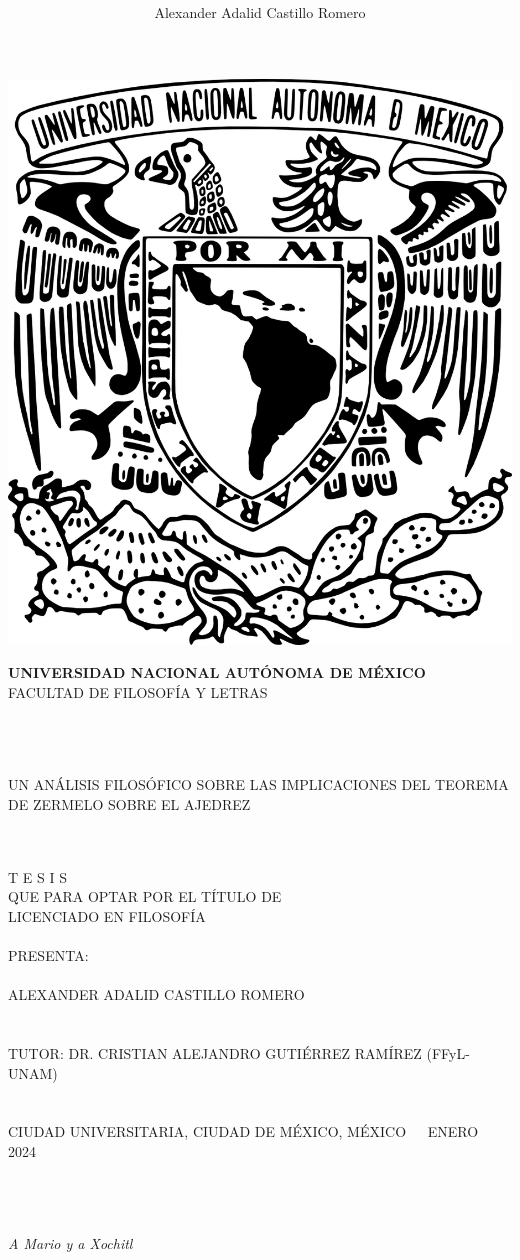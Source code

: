 \documentclass[twoside,openright,12pt,a4paper,spanish]{book}
\title{\textbf{}}
\author{Alexander Adalid Castillo Romero}
\begin{document}
\begin{titlepage}
\begin{center}

\includegraphics[width=3.15 cm,height=3.75 cm]{unam.png} 

\normalsize{\textbf{UNIVERSIDAD NACIONAL AUTÓNOMA DE MÉXICO}\\
FACULTAD DE FILOSOFÍA Y LETRAS \\ \ \\ \ \\ \ }


\Large{UN ANÁLISIS FILOSÓFICO SOBRE LAS IMPLICACIONES DEL TEOREMA DE ZERMELO SOBRE EL AJEDREZ\\ \ \\ \ }

\normalsize{T E S I S\\
QUE PARA OPTAR POR EL TÍTULO DE\\
LICENCIADO EN FILOSOFÍA\\
$\ $\\


PRESENTA:\\
$\ $ \\
ALEXANDER ADALID CASTILLO ROMERO\\
$\ $ \\
$\ $ \\
\footnotesize{TUTOR: DR. CRISTIAN ALEJANDRO GUTIÉRREZ RAMÍREZ (FFyL-UNAM)}\\
$\ $ \\
$\ $ \\
CIUDAD UNIVERSITARIA, CIUDAD DE MÉXICO, MÉXICO   $\ \ \ \ $  ENERO $\ \ \ \ $ 2024
$\ $\\
}


\end{center}
\end{titlepage}

\newpage
$\ $
\thispagestyle{empty} %

\chapter*{}
\begin{flushright}
\textit{A Mario y a Xochitl}
\end{flushright}
\end{document}
